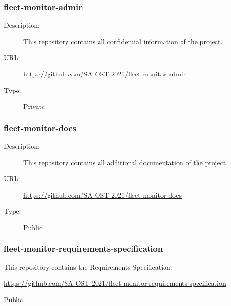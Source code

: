 \subsubsection{fleet-monitor-admin} \label{fleet-monitor-admin} \vspace{-0.2cm}
\begin{description}
  \item[Description:] This repository contains all confidential information of the project.\vspace{-0.25cm}
  \item[URL:] \url{https://github.com/SA-OST-2021/fleet-monitor-admin}\vspace{-0.25cm}
  \item[Type:] Private\vspace{-0.25cm}
\end{description}

\subsubsection{fleet-monitor-docs} \vspace{-0.2cm}
\begin{description}
  \item[Description:] This repository contains all additional documentation of the project.\vspace{-0.25cm}
  \item[URL:] \url{https://github.com/SA-OST-2021/fleet-monitor-docs}\vspace{-0.25cm}
  \item[Type:] Public\vspace{-0.25cm}
\end{description}

\subsubsection{fleet-monitor-requirements-specification} \vspace{-0.2cm}
\begin{description}
  \hfuzz=35.0pt
  \item[Description:] This repository contains the Requirements Specification.\vspace{-0.25cm}
  \item[URL:] \url{https://github.com/SA-OST-2021/fleet-monitor-requirements-specification}\vspace{-0.25cm}
  \item[Type:] Public\vspace{-0.25cm}
\end{description}

